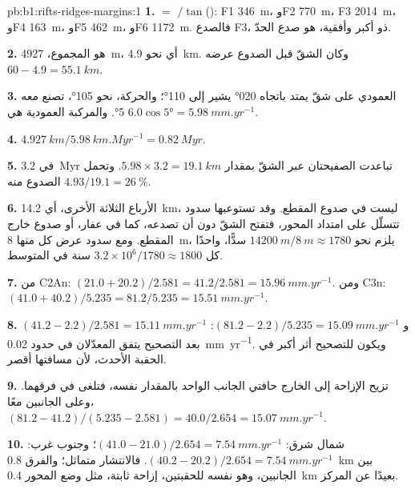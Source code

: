 \begin{solution}{pb:b1:rifts-ridges-margins:1}
\textbf{1.}  $= $ $/\tan$(): F1 \qty{346}{m}، وF2 \qty{770}{m}،
F3 \qty{2014}{m}، وF4 \qty{163}{m}، وF5 \qty{462}{m}، وF6 \qty{1172}{m}. فالصدع F3، ذو أكبر  وأفقية، هو صدع الحدّ.

\textbf{2.}  هو المجموع، \qty{4927}{m}، أي نحو \qty{4.9}{km}. وكان الشقّ قبل الصدوع عرضه $60 - 4.9 = \qty{55.1}{km}$.

\textbf{3.} العمودي على شقّ يمتد باتجاه \ang{020} يشير إلى \ang{110}؛ والحركة، نحو \ang{105}، تصنع معه \ang{5}. والمركبة العمودية هي $6.0\cos\ang{5} = \qty{5.98}{mm.yr^{-1}}$.

\textbf{4.} $\qty{4.927}{km}/\qty{5.98}{km.Myr^{-1}} = \qty{0.82}{Myr}$.

\textbf{5.} في \qty{3.2}{Myr} تباعدت الصفيحتان عبر الشقّ بمقدار $5.98\times3.2 = \qty{19.1}{km}$. وتحمل الصدوع منه $4.93/19.1 = \qty{26}{\percent}$.

\textbf{6.} الأرباع الثلاثة الأخرى، أي \qty{14.2}{km}، ليست في صدوع المقطع. وقد تستوعبها سدود تتسلّل على امتداد المحور، فتفتح الشقّ دون أن تصدعه، كما في عفار، أو صدوع خارج المقطع. ومع سدود عرض كل منها \qty{8}{m}، يلزم نحو $\qty{14200}{m}/\qty{8}{m} \approx 1780$ سدًّا، واحدًا كل $3.2\times10^6/1780 \approx 1800$ سنة في المتوسط.

\textbf{7.} من C2An: $(21.0 + 20.2)/2.581 = 41.2/2.581 =
\qty{15.96}{mm.yr^{-1}}$. ومن C3n: $(41.0 + 40.2)/5.235 = 81.2/5.235 =
\qty{15.51}{mm.yr^{-1}}$.

\textbf{8.} $(41.2 - 2.2)/2.581 = \qty{15.11}{mm.yr^{-1}}$ و
$(81.2 - 2.2)/5.235 = \qty{15.09}{mm.yr^{-1}}$: بعد التصحيح يتفق المعدّلان في حدود \qty{0.02}{mm.yr^{-1}}. ويكون للتصحيح أثر أكبر في الحقبة الأحدث، لأن مسافتها أقصر.

\textbf{9.} تزيح الإزاحة إلى الخارج حافتي الجانب الواحد بالمقدار نفسه، فتلغى في فرقهما. وعلى الجانبين معًا،
$(81.2 - 41.2)/(5.235 - 2.581) = 40.0/2.654 = \qty{15.07}{mm.yr^{-1}}$.

\textbf{10.} شمال شرق: $(41.0 - 21.0)/2.654 = \qty{7.54}{mm.yr^{-1}}$؛ وجنوب غرب: $(40.2 - 20.2)/2.654 = \qty{7.54}{mm.yr^{-1}}$. فالانتشار متماثل؛ والفرق \qty{0.8}{km} بين الجانبين، وهو نفسه للحقبتين، إزاحة ثابتة، مثل وضع المحور \qty{0.4}{km} بعيدًا عن المركز.


\end{solution}

